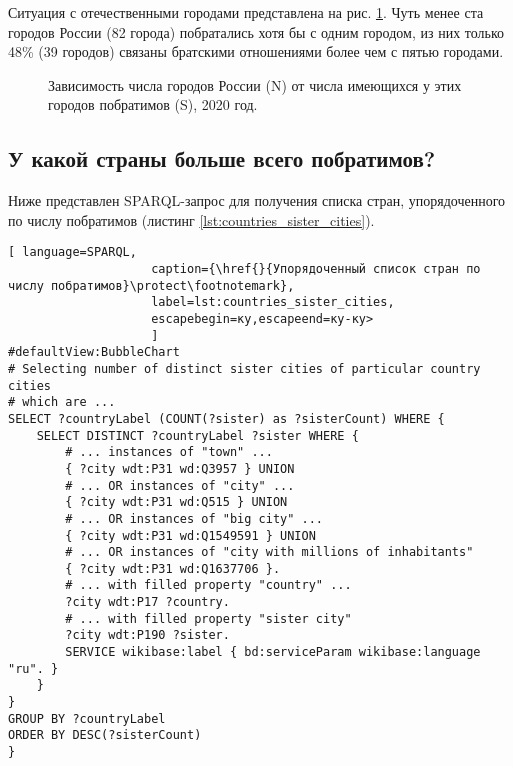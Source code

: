 Ситуация с отечественными городами представлена на рис. \ref{fig:city_relation_Russia_S_N}. Чуть менее ста городов России (82 города) побратались хотя бы с одним городом, из них только 48\% (39 городов) связаны братскими отношениями более чем с пятью городами.

\begin{figure}
{
\setlength{\fboxsep}{0pt}%
\setlength{\fboxrule}{1pt}%
}
  \caption{Зависимость числа городов России (N) от числа имеющихся у этих городов побратимов (S), 2020 год.}
  \label{fig:city_relation_Russia_S_N}
\end{figure}

\subsection{У какой страны больше всего побратимов?}

Ниже представлен SPARQL-запрос для получения списка стран, упорядоченного по числу побратимов (листинг \ref{lst:countries_sister_cities}).

\begin{lstlisting}[ language=SPARQL, 
                    caption={\href{}{Упорядоченный список стран по числу побратимов}\protect\footnotemark},
                    label=lst:countries_sister_cities, 
                    escapebegin=ку,escapeend=ку-ку>
                    ]
#defaultView:BubbleChart
# Selecting number of distinct sister cities of particular country cities 
# which are ... 
SELECT ?countryLabel (COUNT(?sister) as ?sisterCount) WHERE { 
	SELECT DISTINCT ?countryLabel ?sister WHERE {
		# ... instances of "town" ...                          
		{ ?city wdt:P31 wd:Q3957 } UNION
		# ... OR instances of "city" ...
		{ ?city wdt:P31 wd:Q515 } UNION
		# ... OR instances of "big city" ...                                 
		{ ?city wdt:P31 wd:Q1549591 } UNION
		# ... OR instances of "city with millions of inhabitants"                            
		{ ?city wdt:P31 wd:Q1637706 }.
		# ... with filled property "country" ...                                 
		?city wdt:P17 ?country.
		# ... with filled property "sister city"                                        
		?city wdt:P190 ?sister.                                         
		SERVICE wikibase:label { bd:serviceParam wikibase:language "ru". }
	}                                 
}
GROUP BY ?countryLabel
ORDER BY DESC(?sisterCount)
}
\end{lstlisting}

